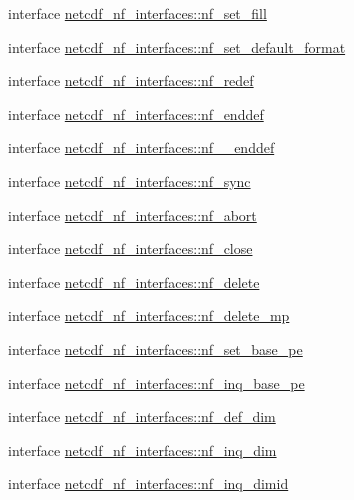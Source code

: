 \begin{DoxyCompactItemize}
\item 
interface \hyperlink{interfacenetcdf__nf__interfaces_1_1nf__set__fill}{netcdf\+\_\+nf\+\_\+interfaces\+::nf\+\_\+set\+\_\+fill}
\item 
interface \hyperlink{interfacenetcdf__nf__interfaces_1_1nf__set__default__format}{netcdf\+\_\+nf\+\_\+interfaces\+::nf\+\_\+set\+\_\+default\+\_\+format}
\item 
interface \hyperlink{interfacenetcdf__nf__interfaces_1_1nf__redef}{netcdf\+\_\+nf\+\_\+interfaces\+::nf\+\_\+redef}
\item 
interface \hyperlink{interfacenetcdf__nf__interfaces_1_1nf__enddef}{netcdf\+\_\+nf\+\_\+interfaces\+::nf\+\_\+enddef}
\item 
interface \hyperlink{interfacenetcdf__nf__interfaces_1_1nf____enddef}{netcdf\+\_\+nf\+\_\+interfaces\+::nf\+\_\+\+\_\+enddef}
\item 
interface \hyperlink{interfacenetcdf__nf__interfaces_1_1nf__sync}{netcdf\+\_\+nf\+\_\+interfaces\+::nf\+\_\+sync}
\item 
interface \hyperlink{interfacenetcdf__nf__interfaces_1_1nf__abort}{netcdf\+\_\+nf\+\_\+interfaces\+::nf\+\_\+abort}
\item 
interface \hyperlink{interfacenetcdf__nf__interfaces_1_1nf__close}{netcdf\+\_\+nf\+\_\+interfaces\+::nf\+\_\+close}
\item 
interface \hyperlink{interfacenetcdf__nf__interfaces_1_1nf__delete}{netcdf\+\_\+nf\+\_\+interfaces\+::nf\+\_\+delete}
\item 
interface \hyperlink{interfacenetcdf__nf__interfaces_1_1nf__delete__mp}{netcdf\+\_\+nf\+\_\+interfaces\+::nf\+\_\+delete\+\_\+mp}
\item 
interface \hyperlink{interfacenetcdf__nf__interfaces_1_1nf__set__base__pe}{netcdf\+\_\+nf\+\_\+interfaces\+::nf\+\_\+set\+\_\+base\+\_\+pe}
\item 
interface \hyperlink{interfacenetcdf__nf__interfaces_1_1nf__inq__base__pe}{netcdf\+\_\+nf\+\_\+interfaces\+::nf\+\_\+inq\+\_\+base\+\_\+pe}
\item 
interface \hyperlink{interfacenetcdf__nf__interfaces_1_1nf__def__dim}{netcdf\+\_\+nf\+\_\+interfaces\+::nf\+\_\+def\+\_\+dim}
\item 
interface \hyperlink{interfacenetcdf__nf__interfaces_1_1nf__inq__dim}{netcdf\+\_\+nf\+\_\+interfaces\+::nf\+\_\+inq\+\_\+dim}
\item 
interface \hyperlink{interfacenetcdf__nf__interfaces_1_1nf__inq__dimid}{netcdf\+\_\+nf\+\_\+interfaces\+::nf\+\_\+inq\+\_\+dimid}

\end{DoxyCompactItemize}
